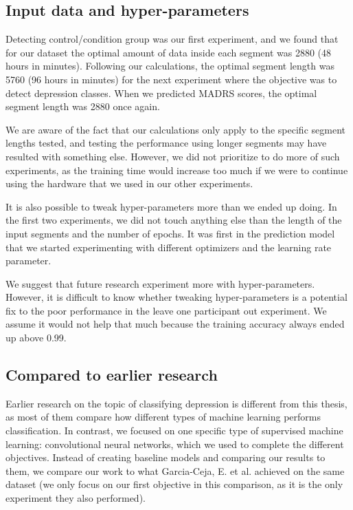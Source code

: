 \subsection{Input data and hyper-parameters}
Detecting control/condition group was our first experiment, and we found that for our dataset the optimal amount of data inside each segment was 2880 (48 hours in minutes). Following our calculations, the optimal segment length was 5760 (96 hours in minutes) for the next experiment where the objective was to detect depression classes. When we predicted MADRS scores, the optimal segment length was 2880 once again. 

We are aware of the fact that our calculations only apply to the specific segment lengths tested, and testing the performance using longer segments may have resulted with something else. However, we did not prioritize to do more of such experiments, as the training time would increase too much if we were to continue using the hardware that we used in our other experiments. 

It is also possible to tweak hyper-parameters more than we ended up doing. In the first two experiments, we did not touch anything else than the length of the input segments and the number of epochs. It was first in the prediction model that we started experimenting with different optimizers and the learning rate parameter. 

We suggest that future research experiment more with hyper-parameters. However, it is difficult to know whether tweaking hyper-parameters is a potential fix to the poor performance in the leave one participant out experiment. We assume it would not help that much because the training accuracy always ended up above 0.99. 

\subsection{Compared to earlier research}
Earlier research on the topic of classifying depression is different from this thesis, as most of them compare how different types of machine learning performs classification. In contrast, we focused on one specific type of supervised machine learning: convolutional neural networks, which we used to complete the different objectives. Instead of creating baseline models and comparing our results to them, we compare our work to what Garcia-Ceja, E. et al. achieved on the same dataset \cite{GarciaCeja2018_classification_bipolar} (we only focus on our first objective in this comparison, as it is the only experiment they also performed). 


